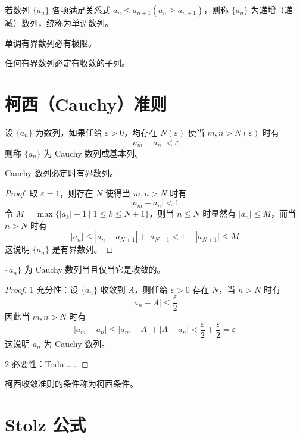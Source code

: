 \begin{definition}
	若数列 $\{a_n\}$ 各项满足关系式 $a_n \leqslant a_{n+1}(a_n \geqslant a_{n+1})$，则称 $\{a_n\}$ 为递增（递减）数列，统称为单调数列。
\end{definition}

\begin{theorem}[单调有界定理]
	单调有界数列必有极限。
\end{theorem}

\begin{theorem}[致密性定理]
	任何有界数列必定有收敛的子列。
\end{theorem}

\section{柯西（Cauchy）准则}

\begin{definition}
	设 $\{a_n\}$ 为数列，如果任给 $\varepsilon>0$，均存在 $N(\varepsilon)$ 使当 $m,n>N(\varepsilon)$ 时有
	$$|a_m-a_n| < \varepsilon$$
	则称 $\{a_n\}$ 为 Cauchy 数列或基本列。
\end{definition}

\begin{theorem}
	Cauchy 数列必定时有界数列。
\end{theorem}
\begin{proof}
	取 $\varepsilon=1$，则存在 $N$ 使得当 $m,n>N$ 时有
	$$|a_m-a_n| < 1$$
	令 $M = \max\{|a_k|+1 \mid 1 \leqslant k \leqslant N+1\}$，则当 $n\leqslant N$ 时显然有 $|a_n|\leqslant M$，而当 $n>N$ 时有
	$$|a_n| \leqslant |a_n-a_{N+1}| + |a_{N+1} < 1+ |a_{N+1}| \leqslant M$$
	这说明 $\{a_n\}$ 是有界数列。
\end{proof}

\begin{theorem}
	$\{a_n\}$ 为 Cauchy 数列当且仅当它是收敛的。
\end{theorem}
\begin{proof}
	\num{1} 充分性：设 $\{a_n\}$ 收敛到 $A$，则任给 $\varepsilon >0$ 存在 $N$，当 $n>N$ 时有
	$$|a_n-A|\leqslant \frac{\varepsilon}{2}$$
	因此当 $m,n>N$ 时有
	$$|a_m-a_n| \leqslant |a_m-A| + |A-a_n| < \frac{\varepsilon}{2}+\frac{\varepsilon}{2}=\varepsilon$$
	这说明 $a_n$ 为 Cauchy 数列。
	
	\num{2} 必要性：Todo ……
\end{proof}

柯西收敛准则的条件称为柯西条件。

\section{Stolz 公式}

